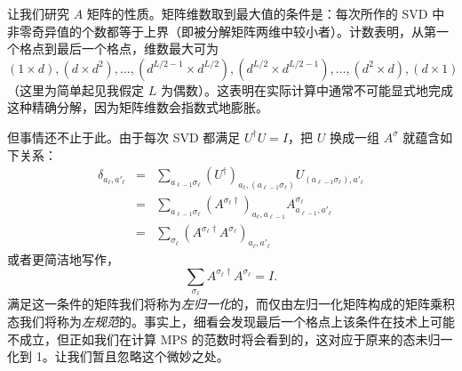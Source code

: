 让我们研究 $A$ 矩阵的性质。矩阵维数取到最大值的条件是：每次所作的 SVD 中非零奇异值的个数都等于上界（即被分解矩阵两维中较小者）。计数表明，从第一个格点到最后一个格点，维数最大可为 $(1 \times d), (d \times d^2), \ldots, (d^{L/2-1} \times d^{L/2}), (d^{L/2} \times d^{L/2-1}), \ldots, (d^2 \times d), (d \times 1)$（这里为简单起见我假定 $L$ 为偶数）。这表明在实际计算中通常不可能显式地完成这种精确分解，因为矩阵维数会指数式地膨胀。

但事情还不止于此。由于每次 SVD 都满足 $U^\dagger U = I$，把 $U$ 换成一组 $A^\sigma$ 就蕴含如下关系：
\begin{eqnarray*}
\delta_{a_\ell,a'_\ell} &=& \sum_{a_{\ell-1}\sigma_\ell} (U^\dagger)_{a_\ell, (a_{\ell-1}\sigma_\ell)} U_{(a_{\ell-1}\sigma_\ell), a'_\ell} \\
&=& \sum_{a_{\ell-1}\sigma_\ell} (A^{\sigma_\ell\dagger})_{a_\ell, a_{\ell-1}} A^{\sigma_\ell}_{a_{\ell-1}, a'_\ell} \\
&=& \sum_{\sigma_\ell} ( A^{\sigma_\ell\dagger} A^{\sigma_\ell})_{a_\ell,a'_\ell} 
\end{eqnarray*}
或者更简洁地写作，
\begin{equation}
\sum_{\sigma_\ell} A^{\sigma_\ell \dagger} A^{\sigma_\ell} = I . 
\end{equation}
满足这一条件的矩阵我们将称为{\em 左归一化}的，而仅由左归一化矩阵构成的矩阵乘积态我们将称为{\em 左规范}的。事实上，细看会发现最后一个格点上该条件在技术上可能不成立，但正如我们在计算 MPS 的范数时将会看到的，这对应于原来的态未归一化到 1。让我们暂且忽略这个微妙之处。

